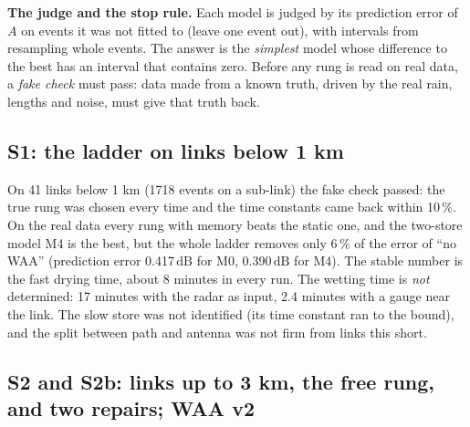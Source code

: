 \documentclass[11pt,a4paper]{article}
\newcommand{\dB}{\,\mathrm{dB}}
\begin{document}
\textbf{The judge and the stop rule.} Each model is judged by its prediction error of $A$ on events it was not fitted
to (leave one event out), with intervals from resampling whole events. The answer is the \emph{simplest} model whose
difference to the best has an interval that contains zero. Before any rung is read on real data, a \emph{fake check}
must pass: data made from a known truth, driven by the real rain, lengths and noise, must give that truth back.

\subsection{S1: the ladder on links below 1 km}
\label{sec:s1}

On 41 links below 1 km (1718 events on a sub-link) the fake check passed: the true rung was chosen every time and the
time constants came back within 10\,\%. On the real data every rung with memory beats the static one, and the two-store
model M4 is the best, but the whole ladder removes only 6\,\% of the error of ``no WAA'' (prediction error 0.417$\dB$
for M0, 0.390$\dB$ for M4). The stable number is the fast drying time, about 8 minutes in every run. The wetting time
is \emph{not} determined: 17 minutes with the radar as input, 2.4 minutes with a gauge near the link. The slow store
was not identified (its time constant ran to the bound), and the split between path and antenna was not firm from
links this short.

\subsection{S2 and S2b: links up to 3 km, the free rung, and two repairs; WAA v2}
\label{sec:s2}
\end{document}
